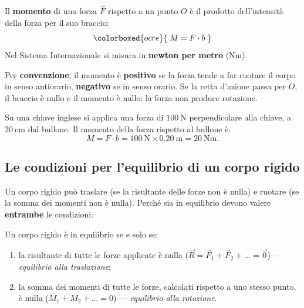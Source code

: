 \begin{definizione}
Il \textbf{momento} di una forza $\vec{F}$ rispetto a un punto $O$ è il prodotto dell'intensità della forza per il suo braccio:
\[
\colorboxed{ocre}{\; M = F\cdot b \;}
\]
Nel Sistema Internazionale si misura in \textbf{newton per metro} ($\si{\newton\meter}$).
\end{definizione}

Per \textbf{convenzione}, il momento è \textbf{positivo} se la forza tende a far ruotare il corpo in senso antiorario, \textbf{negativo} se in senso orario. Se la retta d'azione passa per $O$, il braccio è nullo e il momento è nullo: la forza non produce rotazione.

\begin{testexample}
Su una chiave inglese si applica una forza di $\SI{100}{\newton}$ perpendicolare alla chiave, a $\SI{20}{\centi\meter}$ dal bullone. Il momento della forza rispetto al bullone è:
\[
M = F\cdot b = \SI{100}{\newton}\times\SI{0,20}{\meter} = \SI{20}{\newton\meter}.
\]
\end{testexample}

\subsection{Le condizioni per l'equilibrio di un corpo rigido}
Un corpo rigido può traslare (se la risultante delle forze non è nulla) e ruotare (se la somma dei momenti non è nulla). Perché sia in equilibrio devono valere \textbf{entrambe} le condizioni:

\begin{definizione}
Un corpo rigido è in equilibrio se e solo se:
\begin{enumerate}
\item la risultante di tutte le forze applicate è nulla \quad ($\vec{R} = \vec{F}_1 + \vec{F}_2 + \dots = \vec{0}$) \quad — \emph{equilibrio alla traslazione};
\item la somma dei momenti di tutte le forze, calcolati rispetto a uno stesso punto, è nulla \quad ($M_1 + M_2 + \dots = 0$) \quad — \emph{equilibrio alla rotazione}.
\end{enumerate}
\end{definizione}

